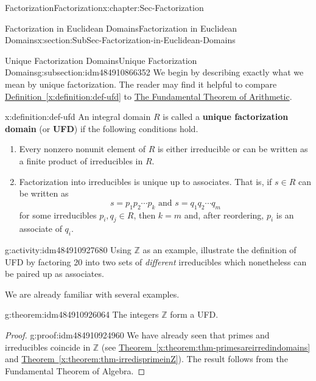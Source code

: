\documentclass[oneside,10pt,]{book}
\newcommand{\xreffont}{\relax}
\newcommand{\terminology}[1]{\textbf{#1}}
\numberwithin{equation}{section}
\def\Z{{\mathbb Z}}
\begin{document}
\begin{chapterptx}{Factorization}{}{Factorization}{}{}{x:chapter:Sec-Factorization}
\begin{sectionptx}{Factorization in Euclidean Domains}{}{Factorization in Euclidean Domains}{}{}{x:section:SubSec-Factorization-in-Euclidean-Domains}
\begin{introduction}{}
\end{introduction}%
%
%
\typeout{************************************************}
\typeout{************************************************}
%
\begin{subsectionptx}{Unique Factorization Domains}{}{Unique Factorization Domains}{}{}{g:subsection:idm484910866352}
We begin by describing exactly what we mean by unique factorization. The reader may find it helpful to compare \hyperref[x:definition:def-ufd]{Definition~{\xreffont\ref{x:definition:def-ufd}}} to \hyperref[x:assemblage:ftarith]{The Fundamental Theorem of Arithmetic}.%
\begin{definition}{}{x:definition:def-ufd}%
%
An integral domain \(R\) is called a \terminology{unique factorization domain} (or \terminology{UFD}) if the following conditions hold.%
\begin{enumerate}
\item{}Every nonzero nonunit element of \(R\) is either irreducible or can be written as a finite product of irreducibles in \(R\).%
\item{}Factorization into irreducibles is unique up to associates. That is, if \(s\in R\) can be written as%
\begin{equation*}
s = p_1 p_2 \cdots p_k \text{ and }  s = q_1 q_2 \cdots q_m
\end{equation*}
for some irreducibles \(p_i, q_j\in R\), then \(k=m\) and, after reordering, \(p_i\) is an associate of \(q_i\).%
\end{enumerate}
%
\end{definition}
\begin{activity}{}{g:activity:idm484910927680}%
Using \(\Z\) as an example, illustrate the definition of UFD by factoring 20 into two sets of \emph{different} irreducibles which nonetheless can be paired up as associates.%
\end{activity}
We are already familiar with several examples.%
\begin{theorem}{}{}{g:theorem:idm484910926064}%
The integers \(\Z\) form a UFD.%
\end{theorem}
\begin{proof}{}{g:proof:idm484910924960}
We have already seen that primes and irreducibles coincide in \(\Z\) (see \hyperref[x:theorem:thm-primesareirredindomains]{Theorem~{\xreffont\ref{x:theorem:thm-primesareirredindomains}}} and \hyperref[x:theorem:thm-irredisprimeinZ]{Theorem~{\xreffont\ref{x:theorem:thm-irredisprimeinZ}}}). The result follows from the Fundamental Theorem of Algebra.\end{proof}

\end{subsectionptx}
\end{sectionptx}
\end{chapterptx}
\end{document}
